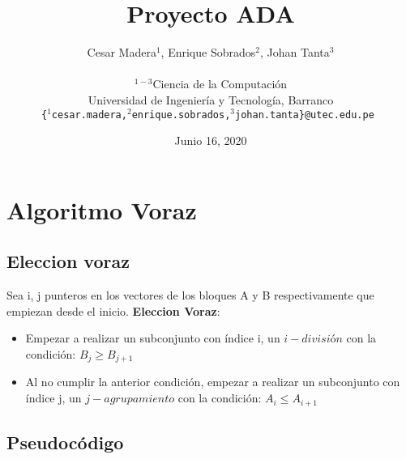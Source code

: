 \documentclass{article}
\title{ \textbf{Proyecto ADA} }
\author{
Cesar Madera$^{1}$, Enrique Sobrados$^{2}$, Johan Tanta$^{3}$\\ \\
\small{$^{1-3}$Ciencia de la Computación}\\
\small{Universidad de Ingeniería y Tecnología, Barranco}\\
\small{\texttt{\{$^{1}$cesar.madera,$^{2}$enrique.sobrados,$^{3}$johan.tanta\}@utec.edu.pe } }
}
\date{\small{Junio 16, 2020}}
\begin{document}
\maketitle

\tableofcontents

\newpage


\section{Algoritmo Voraz}
\subsection{Eleccion voraz}
%
Sea i, j punteros en los vectores de los bloques A y B respectivamente que empiezan desde el inicio. \textbf{Eleccion Voraz}: 

\begin{itemize}
\item Empezar a realizar un subconjunto con índice i, un $i-división$ con la condición: $B_{j} \geq B_{j+1}$
\item Al no cumplir la anterior condición, empezar a realizar un subconjunto con índice j, un $j-agrupamiento$ con la condición:
$A_{i} \leq A_{i+1}$
\end{itemize}

\subsection{Pseudocódigo}
\end{document}
